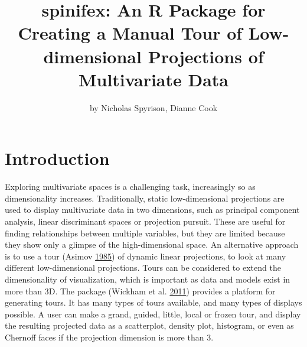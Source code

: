 \title{spinifex: An R Package for Creating a Manual Tour of Low-dimensional
Projections of Multivariate Data}
\author{by Nicholas Spyrison, Dianne Cook}

\maketitle





\hypertarget{introduction}{%
\section{Introduction}\label{introduction}}

Exploring multivariate spaces is a challenging task, increasingly so as
dimensionality increases. Traditionally, static low-dimensional
projections are used to display multivariate data in two dimensions,
such as principal component analysis, linear discriminant spaces or
projection pursuit. These are useful for finding relationships between
multiple variables, but they are limited because they show only a
glimpse of the high-dimensional space. An alternative approach is to use
a tour (Asimov \protect\hyperlink{ref-asimov_grand_1985}{1985}) of
dynamic linear projections, to look at many different low-dimensional
projections. Tours can be considered to extend the dimensionality of
visualization, which is important as data and models exist in more than
3D. The package  (Wickham et al.
\protect\hyperlink{ref-wickham_tourr_2011}{2011}) provides a platform
for generating tours. It has many types of tours available, and many
types of displays possible. A user can make a grand, guided, little,
local or frozen tour, and display the resulting projected data as a
scatterplot, density plot, histogram, or even as Chernoff faces if the
projection dimension is more than 3.

